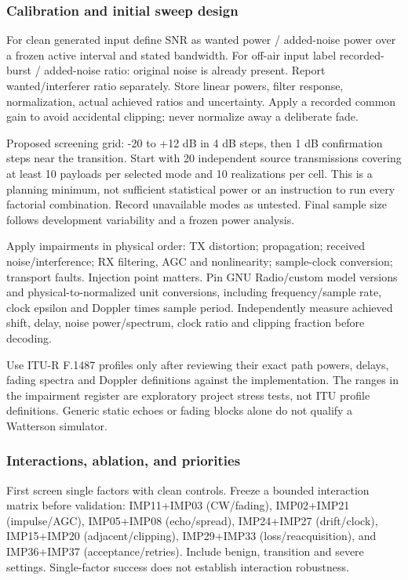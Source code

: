 \documentclass[11pt,a4paper]{article}
\begin{document}
\subsubsection{Calibration and initial sweep design}
For clean generated input define SNR as wanted power / added-noise power over a frozen active interval and stated bandwidth. For off-air input label recorded-burst / added-noise ratio: original noise is already present. Report wanted/interferer ratio separately. Store linear powers, filter response, normalization, actual achieved ratios and uncertainty. Apply a recorded common gain to avoid accidental clipping; never normalize away a deliberate fade.

Proposed screening grid: -20 to +12 dB in 4 dB steps, then 1 dB confirmation steps near the transition. Start with 20 independent source transmissions covering at least 10 payloads per selected mode and 10 realizations per cell. This is a planning minimum, not sufficient statistical power or an instruction to run every factorial combination. Record unavailable modes as untested. Final sample size follows development variability and a frozen power analysis.

Apply impairments in physical order: TX distortion; propagation; received noise/interference; RX filtering, AGC and nonlinearity; sample-clock conversion; transport faults. Injection point matters. Pin GNU Radio/custom model versions and physical-to-normalized unit conversions, including frequency/sample rate, clock epsilon and Doppler times sample period. Independently measure achieved shift, delay, noise power/spectrum, clock ratio and clipping fraction before decoding.

Use ITU-R F.1487 profiles only after reviewing their exact path powers, delays, fading spectra and Doppler definitions against the implementation. The ranges in the impairment register are exploratory project stress tests, not ITU profile definitions. Generic static echoes or fading blocks alone do not qualify a Watterson simulator.

\subsubsection{Interactions, ablation, and priorities}
First screen single factors with clean controls. Freeze a bounded interaction matrix before validation: IMP11+IMP03 (CW/fading), IMP02+IMP21 (impulse/AGC), IMP05+IMP08 (echo/spread), IMP24+IMP27 (drift/clock), IMP15+IMP20 (adjacent/clipping), IMP29+IMP33 (loss/reacquisition), and IMP36+IMP37 (acceptance/retries). Include benign, transition and severe settings. Single-factor success does not establish interaction robustness.
\end{document}
